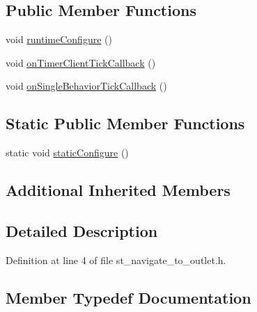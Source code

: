 \subsection*{Public Member Functions}
\begin{DoxyCompactItemize}
\item 
void \hyperlink{structsm__pr2__plugs_1_1StNavigateToOutlet_aa36e4f478b3dc1c2b8fae6ef51f4d4f8}{runtime\+Configure} ()
\item 
void \hyperlink{structsm__pr2__plugs_1_1StNavigateToOutlet_ab990f0f422deb0ef6dd4fcce9cb2823b}{on\+Timer\+Client\+Tick\+Callback} ()
\item 
void \hyperlink{structsm__pr2__plugs_1_1StNavigateToOutlet_ae6a6ee95bcc854792f0b16286a113a06}{on\+Single\+Behavior\+Tick\+Callback} ()
\end{DoxyCompactItemize}
\subsection*{Static Public Member Functions}
\begin{DoxyCompactItemize}
\item 
static void \hyperlink{structsm__pr2__plugs_1_1StNavigateToOutlet_a2dbe242376149d872ee92006b378ebf9}{static\+Configure} ()
\end{DoxyCompactItemize}
\subsection*{Additional Inherited Members}


\subsection{Detailed Description}


Definition at line 4 of file st\+\_\+navigate\+\_\+to\+\_\+outlet.\+h.



\subsection{Member Typedef Documentation}
\mbox{\label{structsm__pr2__plugs_1_1StNavigateToOutlet_a4b5b4d30a2a64c438e9a4d89016fc052}} 
